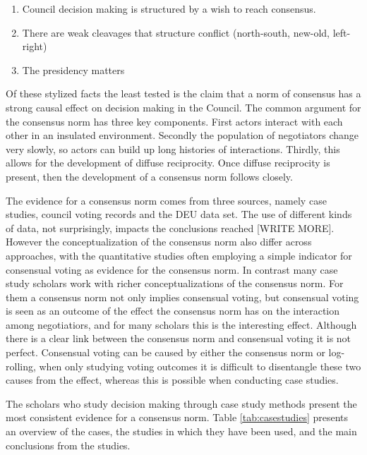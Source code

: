 \begin{enumerate}
\item Council decision making is structured by a wish to reach consensus.
\item There are weak cleavages that structure conflict (north-south, new-old, left-right)
\item The presidency matters
\end{enumerate}

Of these stylized facts the least tested is the claim that a norm of consensus has a strong causal effect on decision making in the Council. The common argument for the consensus norm has three key components. First actors interact with each other in an insulated environment. Secondly the population of negotiators change very slowly, so actors can build up long histories of interactions. Thirdly, this allows for the development of diffuse reciprocity. Once diffuse reciprocity is present, then the development of a consensus norm follows closely. 

The evidence for a consensus norm comes from three sources, namely case studies, council voting records and the DEU data set. The use of different kinds of data, not surprisingly, impacts the conclusions reached [WRITE MORE]. However the conceptualization of the consensus norm also differ across approaches, with the quantitative studies often employing a simple indicator for consensual voting as evidence for the consensus norm. In contrast many case study scholars work with richer conceptualizations of the consensus norm. For them a consensus norm not only implies consensual voting, but consensual voting is seen as an outcome of the effect the consensus norm has on the interaction among negotiatiors, and for many scholars this is the interesting effect. Although there is a clear link between the consensus norm and consensual voting it is not perfect. Consensual voting can be caused by either the consensus norm or log-rolling, when only studying voting outcomes it is difficult to disentangle these two causes from the effect, whereas this is possible when conducting case studies. 

The scholars who study decision making through case study methods present the most consistent evidence for a consensus norm. Table \ref{tab:casestudies} presents an overview of the cases, the studies in which they have been used, and the main conclusions from the studies. 

